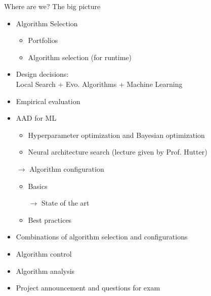 \begin{frame}[c]{Where are we? The big picture}

\begin{itemize}
\item Algorithm Selection
  \begin{itemize}
    \item Portfolios
    \item Algorithm selection (for runtime)
  \end{itemize}
  \item Design decisions:\\ Local Search + Evo. Algorithms + Machine Learning 
  \item Empirical evaluation
  \item AAD for ML
  \begin{itemize}
    \item Hyperparameter optimization and Bayesian optimization 
    \item Neural architecture search (lecture given by Prof. Hutter)
  \end{itemize}
  \item[$\to$] Algorithm configuration 
  \begin{itemize}
    \item Basics 
    \item[$\to$] State of the art 
    \item Best practices 
  \end{itemize}
  \item Combinations of algorithm selection and configurations
  \item Algorithm control 
  \item Algorithm analysis 
  \item Project announcement and questions for exam 
\end{itemize}


\end{frame}

